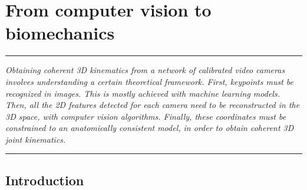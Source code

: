 
\lhead[\fancyplain{}{\leftmark}]%
      {\fancyplain{}{}} %
\chead[\fancyplain{}{}]%
      {\fancyplain{}{}}
\rhead[\fancyplain{}{}]%
      {\fancyplain{}{\rightmark}}%
\lfoot[\fancyplain{}{}]%
      {\fancyplain{}{}}
\cfoot[\fancyplain{}{\thepage}]%
      {\fancyplain{}{\thepage}} %
\rfoot[\fancyplain{}{}]%
     {\fancyplain{}{\scriptsize}}



\chapter{From computer vision to biomechanics}
\label{ch:2}


\begin{center}
\rule{0.7\linewidth}{.5pt}
\begin{minipage}{0.7\linewidth}
\smallskip

\textit{Obtaining coherent 3D kinematics from a network of calibrated video cameras involves understanding a certain theoretical framework. First, keypoints must be recognized in images. This is mostly achieved with machine learning models. Then, all the 2D features detected for each camera need to be reconstructed in the 3D space, with computer vision algorithms. Finally, these coordinates must be constrained to an anatomically consistent model, in order to obtain coherent 3D joint kinematics.}

\end{minipage}
\smallskip
\rule{0.7\linewidth}{.5pt}
\end{center}

\minitoc
\newpage

\section{Introduction}

